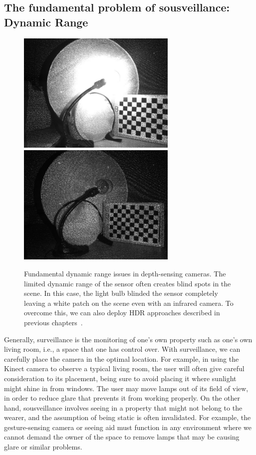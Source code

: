 \subsection{The fundamental problem of sousveillance: Dynamic Range}
\begin{figure}
\centering
\includegraphics[width=3.0in]{ch4/diagrams/high_expo_light.jpg} 
\includegraphics[width=3.0in]{ch4/diagrams/no_light_depth.jpg} \\
\caption{Fundamental dynamic range issues in depth-sensing cameras. The limited dynamic range of the sensor often creates blind spots in the scene. In this case, the light bulb blinded the sensor completely leaving a white patch on the scene even with an infrared camera. To overcome this, we can also deploy HDR approaches described in previous chapters~\cite{lo2012high,lo2013three}.}
\label{fig:ir_range_issue}
\end{figure}

Generally, surveillance is the monitoring of one's own property such as one's own living room, i.e., a space that one has control over. With surveillance, we can carefully place the camera in the optimal location. For example, in using the Kinect camera to observe a typical living room, the user will often give careful consideration to its placement, being sure to avoid placing it where sunlight might shine in from windows. The user may move lamps out of its field of view, in order to reduce glare that prevents it from working properly.  On the other hand, sousveillance involves seeing in a property that might not belong to the wearer, and the assumption of being static is often invalidated. For example, the gesture-sensing camera or seeing aid must function in any environment where we cannot demand the owner of the space to remove lamps that may be causing glare or similar problems.

